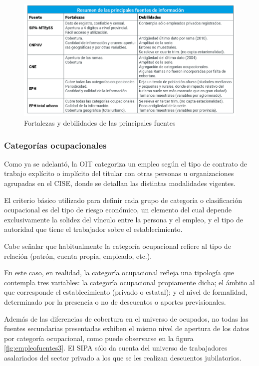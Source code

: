 \documentclass[
  openany]{book}
\begin{document}
\begin{figure}

{\centering \includegraphics[width=1\linewidth]{imagenes/figura3.2} 

}

\caption{Fortalezas y debilidades de las principales fuentes}\label{fig:empleofuentes2}
\end{figure}

\hypertarget{categoruxedas-ocupacionales}{%
\subsubsection{Categorías ocupacionales}\label{categoruxedas-ocupacionales}}

Como ya se adelantó, la OIT categoriza un empleo según el tipo de contrato de trabajo explícito o implícito del titular con otras personas u organizaciones agrupadas en el CISE, donde se detallan las distintas modalidades vigentes.

El criterio básico utilizado para definir cada grupo de categoría o clasificación ocupacional es del tipo de riesgo económico, un elemento del cual depende exclusivamente la solidez del vínculo entre la persona y el empleo, y el tipo de autoridad que tiene el trabajador sobre el establecimiento.

Cabe señalar que habitualmente la categoría ocupacional refiere al tipo de relación (patrón, cuenta propia, empleado, etc.).

En este caso, en realidad, la categoría ocupacional refleja una tipología que contempla tres variables: la categoría ocupacional propiamente dicha; el ámbito al que corresponde el establecimiento (privado o estatal); y el nivel de formalidad, determinado por la presencia o no de descuentos o aportes previsionales.

Además de las diferencias de cobertura en el universo de ocupados, no todas las fuentes secundarias presentadas exhiben el mismo nivel de apertura de los datos por categoría ocupacional, como puede observarse en la figura \ref{fig:empleofuentes3}.
El SIPA sólo da cuenta del universo de trabajadores asalariados del sector privado a los que se les realizan descuentos jubilatorios.
\end{document}
